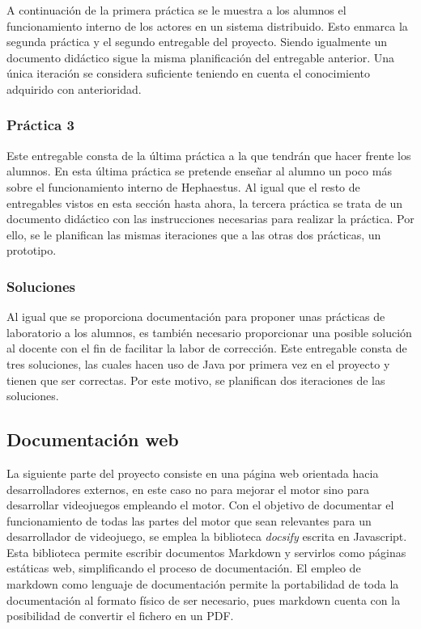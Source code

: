 A continuación de la primera práctica se le muestra a los alumnos el funcionamiento interno de los actores en un sistema distribuido. Esto enmarca la segunda práctica y el segundo entregable del proyecto. Siendo igualmente un documento didáctico sigue la misma planificación del entregable anterior. Una única iteración se considera suficiente teniendo en cuenta el conocimiento adquirido con anterioridad.

\subsubsection{Práctica 3}

Este entregable consta de la última práctica a la que tendrán que hacer frente los alumnos. En esta última práctica se pretende enseñar al alumno un poco más sobre el funcionamiento interno de Hephaestus. Al igual que el resto de entregables vistos en esta sección hasta ahora, la tercera práctica se trata de un documento didáctico con las instrucciones necesarias para realizar la práctica. Por ello, se le planifican las mismas iteraciones que a las otras dos prácticas, un prototipo.

\subsubsection{Soluciones}

Al igual que se proporciona documentación para proponer unas prácticas de laboratorio a los alumnos, es también necesario proporcionar una posible solución al docente con el fin de facilitar la labor de corrección. Este entregable consta de tres soluciones, las cuales hacen uso de Java por primera vez en el proyecto y tienen que ser correctas. Por este motivo, se planifican dos iteraciones de las soluciones.

\subsection{Documentación web}

La siguiente parte del proyecto consiste en una página web orientada hacia desarrolladores externos, en este caso no para mejorar el motor sino para desarrollar videojuegos empleando el motor. Con el objetivo de documentar el funcionamiento de todas las partes del motor que sean relevantes para un desarrollador de videojuego, se emplea la biblioteca \textit{docsify} \cite{docsify} escrita en Javascript. Esta biblioteca permite escribir documentos Markdown y servirlos como páginas estáticas web, simplificando el proceso de documentación. El empleo de markdown como lenguaje de documentación permite la portabilidad de toda la documentación al formato físico de ser necesario, pues markdown cuenta con la posibilidad de convertir el fichero en un PDF.

